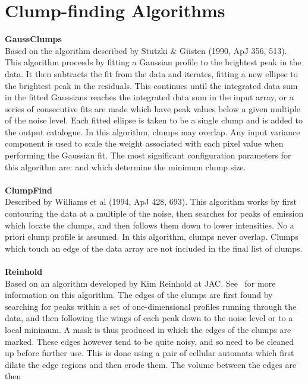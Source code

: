 \documentclass[11pt,oneside,chapters]{starlink}
\begin{document}
\newpage
\chapter{Clump-finding Algorithms}
\label{app:clumpfind}

\textbf{GaussClumps}\\Based on the algorithm described by Stutzki \&
G\"{u}sten (1990, ApJ 356, 513). This algorithm proceeds by fitting a
Gaussian profile to the brightest peak in the data. It then subtracts
the fit from the data and iterates, fitting a new ellipse to the
brightest peak in the residuals. This continues until the integrated
data sum in the fitted Gaussians reaches the integrated data sum in
the input array, or a series of consecutive fits are made which have
peak values below a given multiple of the noise level. Each fitted
ellipse is taken to be a single clump and is added to the output
catalogue. In this algorithm, clumps may overlap. Any input variance
component is used to scale the weight associated with each pixel value
when performing the Gaussian fit. The most significant configuration
parameters for this algorithm are:  and
 which determine the minimum clump size.
\\\\
\textbf{ClumpFind}\\
Described by Williams et al (1994, ApJ 428, 693). This algorithm works
by first contouring the data at a multiple of the noise, then searches
for peaks of emission which locate the clumps, and then follows them
down to lower intensities. No a priori clump profile is assumed. In
this algorithm, clumps never overlap. Clumps which touch an edge of
the data array are not included in the final list of clumps.
\\\\
\textbf{Reinhold}\\
Based on an algorithm developed by Kim Reinhold at JAC. See
\cupidsun\ for more information on this algorithm. The edges of the
clumps  are first found by searching for peaks within a set of
one-dimensional profiles running through the data, and then following
the wings of each peak down to
the noise level or to a local minimum. A mask is thus produced in
which the edges of the clumps are marked. These edges however tend to
be quite noisy, and so need to be cleaned up before further use. This
is done using a pair of cellular automata which first dilate the edge
regions and then erode them. The volume between the edges are then
\end{document}

